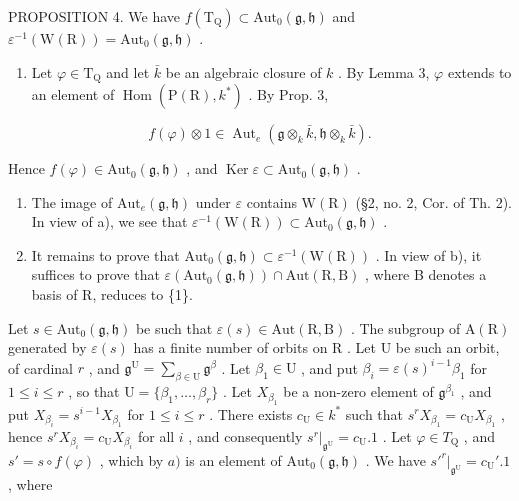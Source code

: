 PROPOSITION 4. We have \(f(\mathrm{T}_{\mathrm{Q}}) \subset \mathrm{Aut}_0(\mathfrak{g}, \mathfrak{h})\) and \(\varepsilon^{-1}(\mathrm{W}(\mathrm{R})) = \mathrm{Aut}_0(\mathfrak{g}, \mathfrak{h})\) .

\begin{enumerate}
\def\labelenumi{\alph{enumi})}
\tightlist
\item
  Let \(\varphi \in \mathrm{T}_{\mathrm{Q}}\) and let \(\bar{k}\) be an algebraic closure of \(k\) . By Lemma 3, \(\varphi\) extends to an element of \(\operatorname{Hom}(\mathrm{P}(\mathrm{R}), k^*)\) . By Prop. 3,
\end{enumerate}

\[
f (\varphi) \otimes 1 \in \operatorname{Aut} _ {e} (\mathfrak {g} \otimes_ {k} \bar {k}, \mathfrak {h} \otimes_ {k} \bar {k}).
\]

Hence \(f(\varphi) \in \mathrm{Aut}_0(\mathfrak{g},\mathfrak{h})\) , and \(\operatorname{Ker} \varepsilon \subset \mathrm{Aut}_0(\mathfrak{g},\mathfrak{h})\) .

\begin{enumerate}
\def\labelenumi{\alph{enumi})}
\setcounter{enumi}{1}
\item
  The image of \(\mathrm{Aut}_e(\mathfrak{g},\mathfrak{h})\) under \(\varepsilon\) contains \(\mathrm{W(R)}\) (§2, no. 2, Cor. of Th. 2). In view of a), we see that \(\varepsilon^{-1}(\mathrm{W(R)})\subset \mathrm{Aut}_0(\mathfrak{g},\mathfrak{h})\) .
\item
  It remains to prove that \(\mathrm{Aut}_0(\mathfrak{g},\mathfrak{h})\subset \varepsilon^{-1}(\mathrm{W}(\mathrm{R}))\) . In view of b), it suffices to prove that \(\varepsilon (\mathrm{Aut}_0(\mathfrak{g},\mathfrak{h}))\cap \mathrm{Aut}(\mathrm{R},\mathrm{B})\) , where B denotes a basis of R, reduces to \{1\}.
\end{enumerate}

Let \(s \in \mathrm{Aut}_0(\mathfrak{g}, \mathfrak{h})\) be such that \(\varepsilon(s) \in \mathrm{Aut}(\mathrm{R}, \mathrm{B})\) . The subgroup of \(\mathrm{A}(\mathrm{R})\) generated by \(\varepsilon(s)\) has a finite number of orbits on \(\mathrm{R}\) . Let \(\mathrm{U}\) be such an orbit, of cardinal \(r\) , and \(\mathfrak{g}^{\mathrm{U}} = \sum_{\beta \in \mathrm{U}} \mathfrak{g}^{\beta}\) . Let \(\beta_1 \in \mathrm{U}\) , and put \(\beta_i = \varepsilon(s)^{i-1}\beta_1\) for \(1 \leq i \leq r\) , so that \(\mathrm{U} = \{\beta_1, \ldots, \beta_r\}\) . Let \(X_{\beta_1}\) be a non-zero element of \(\mathfrak{g}^{\beta_1}\) , and put \(X_{\beta_i} = s^{i-1}X_{\beta_1}\) for \(1 \leq i \leq r\) . There exists \(c_{\mathrm{U}} \in k^*\) such that \(s^r X_{\beta_1} = c_{\mathrm{U}}X_{\beta_1}\) , hence \(s^r X_{\beta_i} = c_{\mathrm{U}}X_{\beta_i}\) for all \(i\) , and consequently \(s^r |_{\mathfrak{g}^{\mathrm{U}}} = c_{\mathrm{U}}.1\) . Let \(\varphi \in T_{\mathrm{Q}}\) , and \(s' = s \circ f(\varphi)\) , which by \(a)\) is an element of \(\mathrm{Aut}_0(\mathfrak{g}, \mathfrak{h})\) . We have \(s'^r |_{\mathfrak{g}^{\mathrm{U}}} = c_{\mathrm{U}}'.1\) , where

